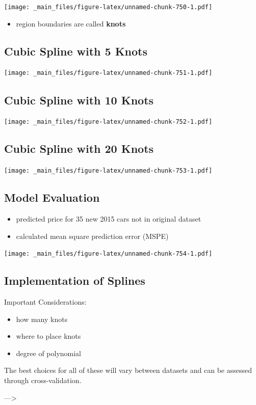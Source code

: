 \documentclass[]{book}
\providecommand{\tightlist}{%
  \setlength{\itemsep}{0pt}\setlength{\parskip}{0pt}}
\begin{document}
\texttt{[image: \_main\_files/figure-latex/unnamed-chunk-750-1.pdf]}

\begin{itemize}
\tightlist
\item
  region boundaries are called \textbf{knots}
\end{itemize}

\subsection{Cubic Spline with 5 Knots}\label{cubic-spline-with-5-knots}

\texttt{[image: \_main\_files/figure-latex/unnamed-chunk-751-1.pdf]}

\subsection{Cubic Spline with 10
Knots}\label{cubic-spline-with-10-knots}

\texttt{[image: \_main\_files/figure-latex/unnamed-chunk-752-1.pdf]}

\subsection{Cubic Spline with 20
Knots}\label{cubic-spline-with-20-knots}

\texttt{[image: \_main\_files/figure-latex/unnamed-chunk-753-1.pdf]}

\subsection{Model Evaluation}\label{model-evaluation}

\begin{itemize}
\tightlist
\item
  predicted price for 35 new 2015 cars not in original dataset\\
\item
  calculated mean square prediction error (MSPE)
\end{itemize}

\texttt{[image: \_main\_files/figure-latex/unnamed-chunk-754-1.pdf]}

\subsection{Implementation of Splines}\label{implementation-of-splines}

Important Considerations:

\begin{itemize}
\tightlist
\item
  how many knots\\
\item
  where to place knots\\
\item
  degree of polynomial
\end{itemize}

The best choices for all of these will vary between datasets and can be
assessed through cross-validation.

---\textgreater{}


\end{document}
